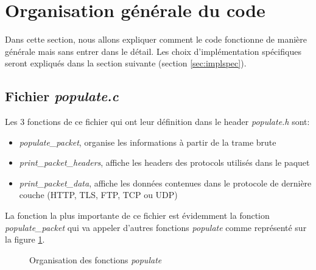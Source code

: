 \documentclass[a4paper]{article}
\begin{document}
\section{Organisation générale du code}



Dans cette section, nous allons expliquer comment le code fonctionne de manière générale mais sans entrer dans le détail. Les choix d'implémentation spécifiques seront expliqués dans la section suivante (section \ref{sec:implspec}).





\subsection{Fichier \textit{populate.c}}



Les 3 fonctions de ce fichier qui ont leur définition dans le header \textit{populate.h} sont:
\begin{itemize}
    \item \textit{populate\_packet}, organise les informations à partir de la trame brute
    \item \textit{print\_packet\_headers}, affiche les headers des protocols utilisés dans le paquet
    \item \textit{print\_packet\_data}, affiche les données contenues dans le protocole de dernière couche (HTTP, TLS, FTP, TCP ou UDP)
\end{itemize}
La fonction la plus importante de ce fichier est évidemment la fonction \textit{populate\_packet} qui va appeler d'autres fonctions \textit{populate} comme représenté sur la figure \ref{fig:orgpopulate}.
\begin{figure}[H]
    \centering
    \caption{Organisation des fonctions \textit{populate}}
    \label{fig:orgpopulate}
\end{figure}
\end{document}
